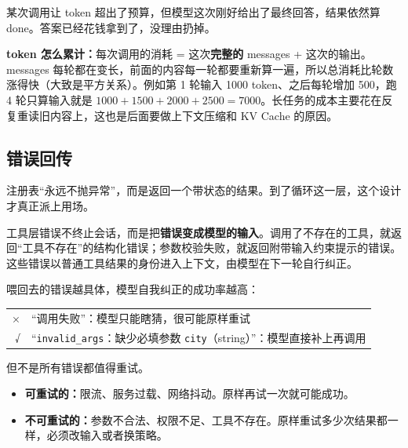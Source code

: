 某次调用让 token 超出了预算，但模型这次刚好给出了最终回答，结果依然算 done。答案已经花钱拿到了，没理由扔掉。

\textbf{token 怎么累计：}每次调用的消耗 = 这次\textbf{完整的} messages + 这次的输出。messages 每轮都在变长，前面的内容每一轮都要重新算一遍，所以总消耗比轮数涨得快（大致是平方关系）。例如第 1 轮输入 1000 token、之后每轮增加 500，跑 4 轮只算输入就是 $1000+1500+2000+2500=7000$。长任务的成本主要花在反复重读旧内容上，这也是后面要做上下文压缩和 KV Cache 的原因。
\subsection{错误回传}

注册表“永远不抛异常”，而是返回一个带状态的结果。到了循环这一层，这个设计才真正派上用场。
\begin{tcolorbox}[enhanced, sharp corners, boxrule=0pt, frame hidden,
                  borderline west={3pt}{0pt}{structurecolor},
                  colback=structurecolor!5]
工具层错误不终止会话，而是把\textbf{错误变成模型的输入}。调用了不存在的工具，就返回“工具不存在”的结构化错误；参数校验失败，就返回附带输入约束提示的错误。这些错误以普通工具结果的身份进入上下文，由模型在下一轮自行纠正。
\end{tcolorbox}
喂回去的错误越具体，模型自我纠正的成功率越高：
\begin{tcolorbox}[enhanced, sharp corners, boxrule=0pt, frame hidden,
                  borderline west={3pt}{0pt}{structurecolor},
                  colback=structurecolor!5]
\begin{tabular}{@{}r@{\quad}l@{}}
  × & “调用失败”：模型只能瞎猜，很可能原样重试 \\
  √ & “\texttt{invalid\_args}：缺少必填参数 \texttt{city}（string）”：模型直接补上再调用
\end{tabular}
\end{tcolorbox}
但不是所有错误都值得重试。 

\begin{itemize}
  \item \textbf{可重试的：}限流、服务过载、网络抖动。原样再试一次就可能成功。
  \item \textbf{不可重试的：}参数不合法、权限不足、工具不存在。原样重试多少次结果都一样，必须改输入或者换策略。
\end{itemize}
